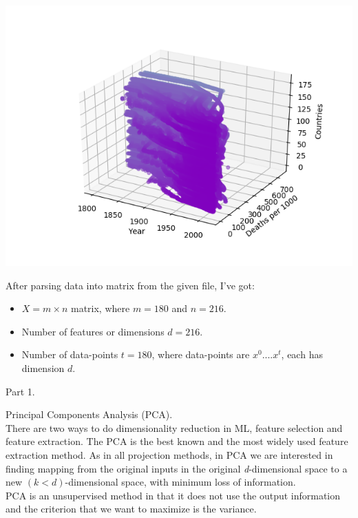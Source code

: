\documentclass[12pt, letterpaper]{article}
\begin{document}
\begin{enumerate}[label=\Roman*.]
	\begin{center}
		\includegraphics[width=\linewidth]{original1.png} \\
	\end{center}
		After parsing data into matrix from the given file, I've got:
		\begin{itemize}
		\item \(X = m \times n\) matrix, where \(m=180\) and \(n = 216\). 
		\item Number of features or dimensions \(d=216\). 
		\item Number of data-points  \(t=180\), where data-points are \(x^0....x^t\), each has dimension \(d\). \\
		\end{itemize}
	{\bf \item Part 1.} Principal Components Analysis (PCA). \\
	
	There are two ways to do dimensionality reduction in ML, feature selection and feature extraction. The PCA is the best known and the most widely used  feature extraction method.  As in all projection methods, in PCA we are interested in finding mapping from the original inputs in the original {\it d}-dimensional space to a new \((k < d)\)-dimensional space, with minimum loss of information. \\ 
	PCA  is an unsupervised method in that it does not use the output information and  the criterion that we want to maximize is the variance. 
	

\end{enumerate}
\end{document}
